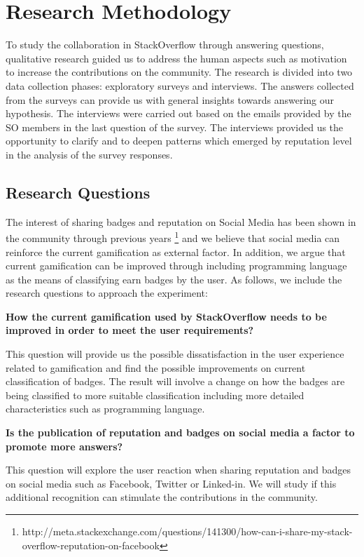 \documentclass{sigchi}
\begin{document}
\section{Research Methodology}
To study the collaboration in StackOverflow through answering questions, qualitative research \cite{Easterbrook} guided us to address the human aspects such as motivation to increase the contributions on the community. The research is divided into two data collection phases: exploratory surveys and interviews. The answers collected from the surveys can provide us with general insights towards answering our hypothesis. The interviews were carried out based on the emails provided by the SO members in the last question of the survey. The interviews provided us the opportunity to clarify and to deepen patterns which emerged by reputation level in the analysis of the survey responses.

\subsection{Research Questions}
The interest of sharing badges and reputation on Social Media has been shown in the community through previous years \footnote{http://meta.stackexchange.com/questions/141300/how-can-i-share-my-stack-overflow-reputation-on-facebook} and we believe that social media can reinforce the current gamification as external factor. In addition, we argue that current gamification can be improved through including programming language as the means of classifying earn badges by the user. As follows, we include the research questions to approach the experiment:

\textbf{How the current gamification used by StackOverflow needs to be improved in order to meet the user requirements?}

This question will provide us the possible dissatisfaction in the user experience related to gamification and find the possible improvements on current classification of badges. The result will involve a change on how the badges are being classified to more suitable classification including more detailed characteristics such as programming language.

\textbf{Is the publication of reputation and badges on social media a
factor to promote more answers?}

This question will explore the user reaction when sharing reputation and badges on social media such as Facebook, Twitter or Linked-in. We will study if this additional recognition can stimulate the contributions in the community.
\end{document}
